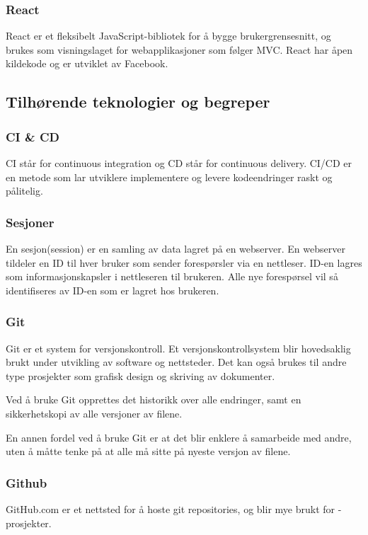 \subsubsection{React}
React\cite{facebook2019r} er et fleksibelt JavaScript-bibliotek for å bygge brukergrensesnitt, og brukes som visningslaget for webapplikasjoner som følger MVC. React har åpen kildekode og er utviklet av Facebook.

\subsection{Tilhørende teknologier og begreper}

\subsubsection{CI \& CD}
CI står for continuous integration og CD står for continuous delivery. CI/CD\cite{Pittet2019cd} er en metode som lar utviklere implementere og levere kodeendringer raskt og pålitelig.

\subsubsection{Sesjoner}
En sesjon\cite{progress2017ohs}(session) er en samling av data lagret på en webserver. En webserver tildeler en ID til hver bruker som sender forespørsler via en nettleser. ID-en lagres som informasjonskapsler i nettleseren til brukeren. Alle nye forespørsel vil så identifiseres av ID-en som er lagret hos brukeren.

\subsubsection{Git}
Git\cite{TechTarget} er et system for versjonskontroll. Et versjonskontrollsystem blir hovedsaklig brukt under utvikling av software og nettsteder. Det kan også brukes til andre type prosjekter som grafisk design og skriving av dokumenter.

Ved å bruke Git opprettes det historikk over alle endringer, samt en sikkerhetskopi av alle versjoner av filene.

En annen fordel ved å bruke Git er at det blir enklere å samarbeide med andre, uten å måtte tenke på at alle må sitte på nyeste versjon av filene.

\subsubsection{Github}
GitHub.com er et nettsted for å hoste git repositories, og blir mye brukt for -prosjekter. 

